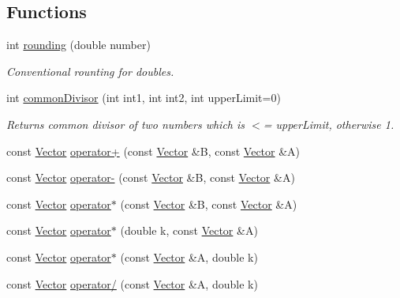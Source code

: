 \subsection*{Functions}
\begin{DoxyCompactItemize}
\item 
int \hyperlink{namespace_p_c_a_acd05fa0d440ac1781a76499f3cdb3f38}{rounding} (double number)
\begin{DoxyCompactList}\small\item\em Conventional rounting for doubles. \end{DoxyCompactList}\item 
int \hyperlink{namespace_p_c_a_a13d2c7cbde32faf05da77e81c6396b92}{common\+Divisor} (int int1, int int2, int upper\+Limit=0)
\begin{DoxyCompactList}\small\item\em Returns common divisor of two numbers which is $<$= upper\+Limit, otherwise 1. \end{DoxyCompactList}\item 
const \hyperlink{class_p_c_a_1_1_vector}{Vector} \hyperlink{namespace_p_c_a_a017b6648f950fd5e297bc92225a425dc}{operator+} (const \hyperlink{class_p_c_a_1_1_vector}{Vector} \&B, const \hyperlink{class_p_c_a_1_1_vector}{Vector} \&A)
\item 
const \hyperlink{class_p_c_a_1_1_vector}{Vector} \hyperlink{namespace_p_c_a_a430437e74079b33bcf7a99ef38c01134}{operator-\/} (const \hyperlink{class_p_c_a_1_1_vector}{Vector} \&B, const \hyperlink{class_p_c_a_1_1_vector}{Vector} \&A)
\item 
const \hyperlink{class_p_c_a_1_1_vector}{Vector} \hyperlink{namespace_p_c_a_a49f60e2a8814942d40f8df470c723214}{operator$\ast$} (const \hyperlink{class_p_c_a_1_1_vector}{Vector} \&B, const \hyperlink{class_p_c_a_1_1_vector}{Vector} \&A)
\item 
const \hyperlink{class_p_c_a_1_1_vector}{Vector} \hyperlink{namespace_p_c_a_a6f1801f8e53ab87a1f3175ec18fa3115}{operator$\ast$} (double k, const \hyperlink{class_p_c_a_1_1_vector}{Vector} \&A)
\item 
const \hyperlink{class_p_c_a_1_1_vector}{Vector} \hyperlink{namespace_p_c_a_a58012056e60671ce13c8318b3cd1ec8f}{operator$\ast$} (const \hyperlink{class_p_c_a_1_1_vector}{Vector} \&A, double k)
\item 
const \hyperlink{class_p_c_a_1_1_vector}{Vector} \hyperlink{namespace_p_c_a_a5144cc8f2a3d8ab924e8c4c1c32a2aed}{operator/} (const \hyperlink{class_p_c_a_1_1_vector}{Vector} \&A, double k)
\end{DoxyCompactItemize}
